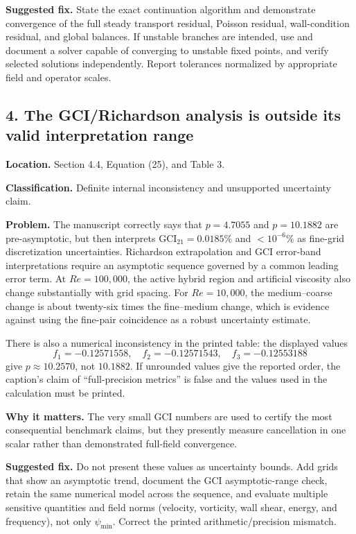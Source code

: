 \documentclass[11pt]{article}
\newcommand{\Rey}{\mathit{Re}}
\begin{document}
\textbf{Suggested fix.} State the exact continuation algorithm and demonstrate convergence of the full steady transport residual, Poisson residual, wall-condition residual, and global balances. If unstable branches are intended, use and document a solver capable of converging to unstable fixed points, and verify selected solutions independently. Report tolerances normalized by appropriate field and operator scales.

\subsection*{4. The GCI/Richardson analysis is outside its valid interpretation range}

\textbf{Location.} Section 4.4, Equation (25), and Table 3.

\textbf{Classification.} Definite internal inconsistency and unsupported uncertainty claim.

\textbf{Problem.} The manuscript correctly says that $p=4.7055$ and $p=10.1882$ are pre-asymptotic, but then interprets $\mathrm{GCI}_{21}=0.0185\%$ and $<10^{-6}\%$ as fine-grid discretization uncertainties. Richardson extrapolation and GCI error-band interpretations require an asymptotic sequence governed by a common leading error term. At $\Rey=100{,}000$, the active hybrid region and artificial viscosity also change substantially with grid spacing. For $\Rey=10{,}000$, the medium--coarse change is about twenty-six times the fine--medium change, which is evidence against using the fine-pair coincidence as a robust uncertainty estimate.

There is also a numerical inconsistency in the printed table: the displayed values
\[
f_1=-0.12571558,\quad f_2=-0.12571543,\quad f_3=-0.12553188
\]
give $p\approx10.2570$, not $10.1882$. If unrounded values give the reported order, the caption's claim of ``full-precision metrics'' is false and the values used in the calculation must be printed.

\textbf{Why it matters.} The very small GCI numbers are used to certify the most consequential benchmark claims, but they presently measure cancellation in one scalar rather than demonstrated full-field convergence.

\textbf{Suggested fix.} Do not present these values as uncertainty bounds. Add grids that show an asymptotic trend, document the GCI asymptotic-range check, retain the same numerical model across the sequence, and evaluate multiple sensitive quantities and field norms (velocity, vorticity, wall shear, energy, and frequency), not only $\psi_{\min}$. Correct the printed arithmetic/precision mismatch.
\end{document}
